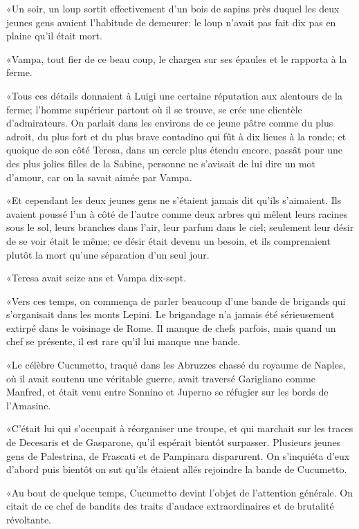 «Un soir, un loup sortit effectivement d'un bois de sapins près duquel les deux jeunes gens avaient l'habitude de demeurer: le loup n'avait pas fait dix pas en plaine qu'il était mort. 

«Vampa, tout fier de ce beau coup, le chargea sur ses épaules et le rapporta à la ferme. 

«Tous ces détails donnaient à Luigi une certaine réputation aux alentours de la ferme; l'homme supérieur partout où il se trouve, se crée une clientèle d'admirateurs. On parlait dans les environs de ce jeune pâtre comme du plus adroit, du plus fort et du plus brave contadino qui fût à dix lieues à la ronde; et quoique de son côté Teresa, dans un cercle plus étendu encore, passât pour une des plus jolies filles de la Sabine, personne ne s'avisait de lui dire un mot d'amour, car on la savait aimée par Vampa. 

«Et cependant les deux jeunes gens ne s'étaient jamais dit qu'ils s'aimaient. Ils avaient poussé l'un à côté de l'autre comme deux arbres qui mêlent leurs racines sous le sol, leurs branches dans l'air, leur parfum dans le ciel; seulement leur désir de se voir était le même; ce désir était devenu un besoin, et ils comprenaient plutôt la mort qu'une séparation d'un seul jour. 

«Teresa avait seize ans et Vampa dix-sept. 

«Vers ces temps, on commença de parler beaucoup d'une bande de brigands qui s'organisait dans les monts Lepini. Le brigandage n'a jamais été sérieusement extirpé dans le voisinage de Rome. Il manque de chefs parfois, mais quand un chef se présente, il est rare qu'il lui manque une bande. 

«Le célèbre Cucumetto, traqué dans les Abruzzes chassé du royaume de Naples, où il avait soutenu une véritable guerre, avait traversé Garigliano comme Manfred, et était venu entre Sonnino et Juperno se réfugier sur les bords de l'Amasine. 

«C'était lui qui s'occupait à réorganiser une troupe, et qui marchait sur les traces de Decesaris et de Gasparone, qu'il espérait bientôt surpasser. Plusieurs jeunes gens de Palestrina, de Frascati et de Pampinara disparurent. On s'inquiéta d'eux d'abord puis bientôt on sut qu'ils étaient allés rejoindre la bande de Cucumetto. 

«Au bout de quelque temps, Cucumetto devint l'objet de l'attention générale. On citait de ce chef de bandits des traits d'audace extraordinaires et de brutalité révoltante. 

